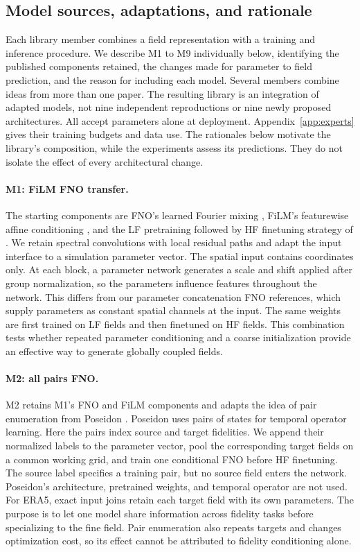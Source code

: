 \subsection{Model sources, adaptations, and rationale}
\label{app:adaptations}
Each library member combines a field representation with a training and inference
procedure. We describe M1 to M9 individually below, identifying the published
components retained, the changes made for parameter to field prediction, and
the reason for including each model. Several members combine ideas from more
than one paper. The resulting library is an integration of adapted models,
not nine independent reproductions or nine newly proposed architectures.
All accept parameters alone at deployment. Appendix~\ref{app:experts} gives
their training budgets and data use. The rationales below motivate the library's
composition, while the experiments assess its predictions. They do not isolate
the effect of every architectural change.

\paragraph{M1: FiLM FNO transfer.}
The starting components are FNO's learned Fourier mixing \citep{li2021fno},
FiLM's featurewise affine conditioning \citep{perez2018}, and the LF pretraining
followed by HF finetuning strategy of \citet{lyu2023}. We retain spectral
convolutions with local residual paths and adapt the input interface to a
simulation parameter vector. The spatial input contains coordinates only.
At each block, a parameter network generates a scale and shift applied after
group normalization, so the parameters influence features throughout the
network. This differs from our parameter concatenation FNO references, which
supply parameters as constant spatial channels at the input. The same weights
are first trained on LF fields and then finetuned on HF fields. This combination
tests whether repeated parameter conditioning and a coarse initialization
provide an effective way to generate globally coupled fields.

\paragraph{M2: all pairs FNO.}
M2 retains M1's FNO and FiLM components \citep{li2021fno,perez2018} and adapts
the idea of pair enumeration from Poseidon \citep{herde2024}. Poseidon uses
pairs of states for temporal operator learning. Here the pairs index source
and target fidelities. We append their normalized labels to the parameter
vector, pool the corresponding target fields on a common working grid, and
train one conditional FNO before HF finetuning. The source label specifies a
training pair, but no source field enters the network. Poseidon's architecture,
pretrained weights, and temporal operator are not used. For ERA5, exact input
joins retain each target field with its own parameters. The purpose is to let
one model share information across fidelity tasks before specializing to the
fine field. Pair enumeration also repeats targets and changes optimization
cost, so its effect cannot be attributed to fidelity conditioning alone.

